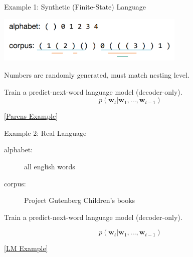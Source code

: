 \documentclass{beamer}
\let\tempone\itemize
\let\temptwo\enditemize
\renewenvironment{itemize}{\tempone\addtolength{\itemsep}{0.5\baselineskip}}{\temptwo}
\newcommand{\air}{\vspace{0.25cm}}
\newcommand{\mair}{\vspace{-0.25cm}}
\newcommand{\wvec}{\mathbf{w}}
\newcommand{\Cite}[1]{{\footnotesize \citep{#1}}}
\begin{document}
\begin{frame}
  \centerline{ \Cite{Strobelt2016}}
  \air 

  \centerline{\alert{Example 1}: Synthetic (Finite-State) Language}
  \air

  \begin{center}
    \includegraphics[width=9cm]{parenlang}
  \end{center}
  \mair

  \begin{itemize}
  \item Numbers are randomly generated, must match nesting level.
    \air

  \item Train a predict-next-word language model (decoder-only).
  \end{itemize}
    \[ p(\wvec_t | \wvec_1, \ldots, \wvec_{t-1}) \] 
  
\air
  \centerline{\href{http://lstm.seas.harvard.edu/client/pattern_finder.html?data_set=00parens&source=states::states2&pos=150}{[Parens Example]}}

  \centerline{\Cite{Strobelt2016}}
\end{frame}



\begin{frame}
  \centerline{ \Cite{Strobelt2016}}
  \air 
  \centerline{\alert{Example 2}: Real Language}
  \air

  \begin{description}
  \item[alphabet:] all english words
  \item[corpus:] Project Gutenberg Children's books 
  \end{description}

  \begin{itemize}

  \item Train a predict-next-word language model (decoder-only).

  
  \end{itemize}
    \[ p(\wvec_t | \wvec_1, \ldots, \wvec_{t-1}) \] 

\air
  \centerline{ \href{http://lstm.seas.harvard.edu/client/pattern_finder.html?data_set=05childbook&source=states::states1&pos=100}{[LM Example]}}
\end{frame}
\end{document}
